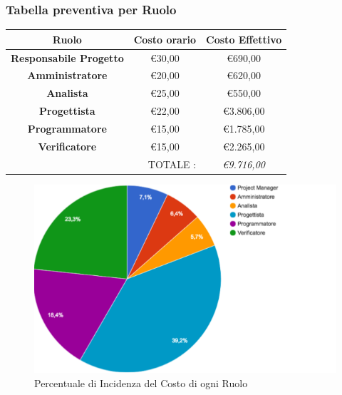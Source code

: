 \documentclass[12pt,a4paper,titlepage]{article}
\begin{document}
	\subsubsection{Tabella preventiva per Ruolo}
	\begin{center}
	{\renewcommand\arraystretch{1.2} %
		\begin{tabular}{|c|c|c|}
			\hline 
			\textbf{Ruolo} & \textbf{Costo orario} & \textbf{Costo Effettivo} \\ 
			\hline 
			\textbf{Responsabile Progetto} & \euro 30,00 & \euro 690,00 \\ 
			\hline 
			\textbf{Amministratore} & \euro 20,00 & \euro 620,00 \\ 
			\hline 
			\textbf{Analista} & \euro 25,00 & \euro 550,00 \\ 
			\hline 
			\textbf{Progettista} & \euro 22,00 & \euro 3.806,00 \\ 
			\hline 
			\textbf{Programmatore} & \euro 15,00 & \euro 1.785,00 \\ 
			\hline 
			\textbf{Verificatore} & \euro 15,00 & \euro 2.265,00 \\ 
			\hline 
			\multicolumn{2}{r|}{TOTALE :} & \textit{\euro 9.716,00 } \\ 
		\end{tabular}
	} 
	\vspace{0.7cm}
	\begin{figure}[p]
		\centering
		\includegraphics[width=1\linewidth]{"TortaIncisioneCosti"}
		\caption{Percentuale di Incidenza del Costo di ogni Ruolo}
		\label{fig:torta-incisione-costi}
	\end{figure}
		
	\end{center}
\end{document}
